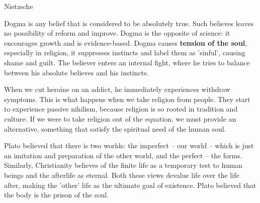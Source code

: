 \documentclass[12pt, a4paper]{article}
\begin{document}

\titlehead{Beyond Good and Evil}{Nietzsche}



Dogma is any belief that is considered to be absolutely true.
Such believes leaves no possibility of reform and improve. Dogma
is the opposite of science: it encourages growth and
is evidence-based. Dogma causes \textbf{tension of the soul}, especially
in religion, it suppresses instincts and label them as 'sinful',
causing shame and guilt. The believer enters an internal fight,
where he tries to balance between his absolute believes and 
his instincts. 


When we cut heroine on an addict, he immediately experiences 
withdraw symptoms. This is what happens when we take religion
from people. They start to experience passive nihilism, because
religion is so rooted in tradition and culture. If we were to 
take religion out of the equation, we must provide an alternative,
something that satisfy the spiritual need of the human soul.


Plato believed that there is two worlds: the imperfect -- our world -- which is just an imitation and preparation of the other world,
and the perfect -- the forms. Similarly, Christianity believes 
of the finite life as a temporary test to human beings and the
afterlife as eternal. Both these views devalue life over the life
after, making the 'other' life as the ultimate goal of existence.
Plato believed that the body is the prison of the soul.















  
\end{document}
